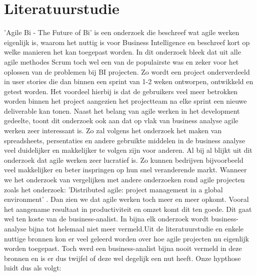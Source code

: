 \documentclass{hogent-article}
\begin{document}
\section{Literatuurstudie}


'Agile Bi - The Future of Bi'\autocite{Muntean2013} is een onderzoek die beschreef wat agile werken eigenlijk is, waarom het nuttig is voor Business Intelligence en beschreef kort op welke manieren het kan toegepast worden. In dit onderzoek bleek dat uit alle agile methodes Scrum toch wel een van de populairste was en zeker voor het oplossen van de problemen bij BI projecten. Zo wordt een project onderverdeeld in user stories die dan binnen een sprint van 1-2 weken ontworpen, ontwikkeld en getest worden. Het voordeel hierbij is dat de gebruikers veel meer betrokken worden binnen het project aangezien het projectteam na elke sprint een nieuwe deliverable kan tonen. Naast het belang van agile werken in het development gedeelte, toont dit onderzoek ook aan dat op vlak van business analyse agile werken zeer interessant is. Zo zal volgens het onderzoek het maken van spreadsheets, persentaties en andere gebruikte middelen in de business analyse veel duidelijker en makkelijker te volgen zijn voor anderen. Al bij al blijkt uit dit onderzoek dat agile werken zeer lucratief is. Zo kunnen bedrijven bijvoorbeeld veel makkelijker en beter inspringen op hun snel veranderende markt. \newline\newline Wanneer we het onderzoek van \autocite{Muntean2013} vergelijken met andere onderzoeken rond agile projecten zoals het onderzoek: 'Distributed agile: project management in a global environment' \autocite{LeeYong2009}. Dan zien we dat agile werken toch meer en meer opkomt. Vooral het aangename resultaat in productiviteit en omzet komt dit ten goede.  Dit gaat wel ten koste van de business-analist. In bijna elk onderzoek wordt business-analyse bijna tot helemaal niet meer vermeld.\newline \newline Uit de literatuurstudie en enkele nuttige bronnen kon er veel geleerd worden over hoe agile projecten nu eigenlijk worden toegepast. Toch werd een business-analist bijna nooit vermeld in deze bronnen en is er dus twijfel of deze wel degelijk een nut heeft. Onze hypthose luidt dus als volgt:\newline
\end{document}
